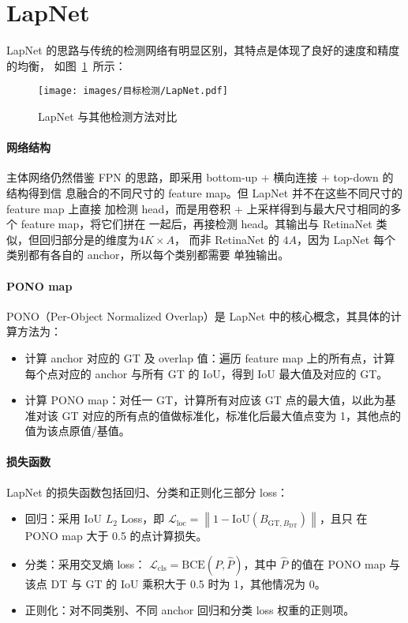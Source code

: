 \section{LapNet}
LapNet 的思路与传统的检测网络有明显区别，其特点是体现了良好的速度和精度的均衡，
如图~\ref{fig:LapNet}~所示：

\begin{figure}[ht]
  \centering
  \texttt{[image: images/目标检测/LapNet.pdf]}
  \caption{LapNet 与其他检测方法对比}\label{fig:LapNet}
\end{figure}

\paragraph{网络结构}
主体网络仍然借鉴 FPN 的思路，即采用 bottom-up + 横向连接 + top-down 的结构得到信
息融合的不同尺寸的 feature map。但 LapNet 并不在这些不同尺寸的feature map 上直接
加检测 head，而是用卷积 + 上采样得到与最大尺寸相同的多个 feature map，将它们拼在
一起后，再接检测 head。其输出与 RetinaNet 类似，但回归部分是的维度为$4 K \times A$，
而非 RetinaNet 的 $4A$，因为 LapNet 每个类别都有各自的 anchor，所以每个类别都需要
单独输出。

\paragraph{PONO map}
PONO（Per-Object Normalized Overlap）是 LapNet 中的核心概念，其具体的计算方法为：

\begin{itemize}
  \item 计算 anchor 对应的 GT 及 overlap 值：遍历 feature map 上的所有点，计算
    每个点对应的 anchor 与所有 GT 的 IoU，得到 IoU 最大值及对应的 GT。
  \item 计算 PONO map：对任一 GT，计算所有对应该 GT 点的最大值，以此为基准对该 GT
    对应的所有点的值做标准化，标准化后最大值点变为 1，其他点的值为该点原值/基值。
\end{itemize}

\paragraph{损失函数}
LapNet 的损失函数包括回归、分类和正则化三部分 loss：

\begin{itemize}
  \item 回归：采用 IoU $L_2$ Loss，即 $\mathcal{L}_{\mathrm{loc}} =
    \left \| 1 - \mathrm{IoU}(B_{\mathrm{GT}, B_{\mathrm{DT}}}) \right\|$，且只
    在 PONO map 大于 0.5 的点计算损失。
  \item 分类：采用交叉熵 loss：
    $\mathcal{L}_{\mathrm{cls}}=\mathrm{BCE}(P, \hat{P})$，其中 $\hat{P}$ 的值在
    PONO map 与该点 DT 与 GT 的 IoU 乘积大于 0.5 时为 1，其他情况为 0。
  \item 正则化：对不同类别、不同 anchor 回归和分类 loss 权重的正则项。
\end{itemize}


